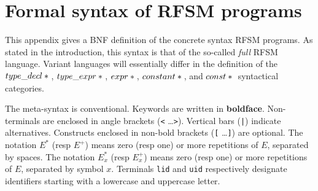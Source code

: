 \chapter{ Formal syntax of RFSM programs}
\label{cha:bnf}

This appendix gives a BNF definition of the concrete syntax RFSM programs.
As stated in the introduction, this syntax is that of the so-called \emph{full} RFSM language.
Variant languages will essentially differ in the definition of the
$type\_decl*{}$,
$type\_expr*{}$,
$expr*{}$,
$constant*{}$,
and $const*{}$
syntactical categories.

\medskip
The meta-syntax is conventional. Keywords are written in \textbf{boldface}.  Non-terminals are
enclosed in angle brackets ({\tt <} \ldots {\tt >}).  Vertical bars ({\tt |}) indicate
alternatives.  Constructs enclosed in non-bold brackets ({\tt [} \ldots {\tt ]}) are optional.
The notation $E^*$ (resp $E^+$) means zero (resp one) or more repetitions of $E$, separated by spaces.
The notation $E^*_x$ (resp $E^+_x$) means zero (resp one) or more repetitions of $E$, separated by
symbol $x$. Terminals \verb|lid| and \verb|uid| respectively designate identifiers
starting with a lowercase and uppercase letter. 



